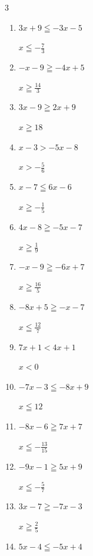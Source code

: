 \begin{multicols}{3}
\begin{enumerate}
\columnbreak %

  \item $3x+9\leqq -3x-5$

        $\displaystyle x\leqq -\frac{7}{3}$

  \item $-x-9\geqq -4x+5$

        $\displaystyle x\geqq \frac{14}{3}$

  \item $3x-9\geqq 2x+9$

        $\displaystyle x\geqq 18$

  \item $x-3>-5x-8$

        $\displaystyle x>-\frac{5}{6}$

  \item $x-7\leqq 6x-6$

        $\displaystyle x\geqq -\frac{1}{5}$

  \item $4x-8\geqq -5x-7$

        $\displaystyle x\geqq \frac{1}{9}$

  \item $-x-9\geqq -6x+7$

        $\displaystyle x\geqq \frac{16}{5}$

  \item $-8x+5\geqq -x-7$

        $\displaystyle x\leqq \frac{12}{7}$

  \item $7x+1<4x+1$

        $\displaystyle x<0$

  \item $-7x-3\leqq -8x+9$

        $\displaystyle x\leqq 12$

  \item $-8x-6\geqq 7x+7$

        $\displaystyle x\leqq -\frac{13}{15}$

  \item $-9x-1\geqq 5x+9$

        $\displaystyle x\leqq -\frac{5}{7}$

  \item $3x-7\geqq -7x-3$

        $\displaystyle x\geqq \frac{2}{5}$

  \item $5x-4\leqq -5x+4$


\end{enumerate}
\end{multicols}
